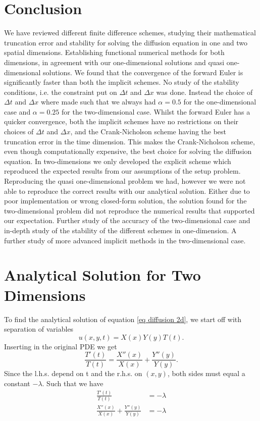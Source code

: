 \documentclass[%
reprint,
nofootinbib,
amsmath,amssymb,
aps,
]{revtex4-1}
\newcommand{\dt}{{\Delta t}}
\newcommand{\dx}{{\Delta x}}
\begin{document}
\section{Conclusion} %
We have reviewed different finite difference schemes, studying their mathematical truncation error and stability for solving the diffusion equation in one and two spatial dimensions. Establishing functional numerical methods for both dimensions, in agreement with our one-dimensional solutions and quasi one-dimensional solutions. We found that the convergence of the forward Euler is significantly faster than both the implicit schemes. No study of the stability conditions, i.e. the constraint put on $\dt$ and $\dx$ was done. Instead the choice of $\dt$ and $\dx$ where made such that we always had $\alpha = 0.5$ for the one-dimensional case and $\alpha = 0.25$ for the two-dimensional case. Whilst the forward Euler has a quicker convergence, both the implicit schemes have no restrictions on their choices of $\dt$ and $\dx$, and the Crank-Nicholson scheme having the best truncation error in the time dimension. This makes the Crank-Nicholson scheme, even though computationally expensive, the best choice for solving the diffusion equation. In two-dimensions we only developed the explicit scheme which reproduced the expected results from our assumptions of the setup problem. Reproducing the quasi one-dimensional problem we had, however we were not able to reproduce the correct results with our analytical solution. Either due to poor implementation or wrong closed-form solution, the solution found for the two-dimensional problem did not reproduce the numerical results that supported our expectation. Further study of the accuracy of the two-dimensional case and in-depth study of the stability of the different schemes in one-dimension. A further study of more advanced implicit methods in the two-dimensional case.





\appendix
\section{Analytical Solution for Two Dimensions}\label{app 2DA}
To find the analytical solution of equation \eqref{eq diffusion 2d}, we start off with separation of variables
\begin{equation}
	u(x,y,t) = X(x)Y(y)T(t).
\end{equation}
Inserting in the original PDE we get 
\begin{equation}
	\frac{T'(t)}{T(t)} = \frac{X''(x)}{X(x)} + \frac{Y''(y)}{Y(y)}.
\end{equation}
Since the l.h.s. depend on t and the r.h.s. on $(x,y)$, both sides must equal a constant $-\lambda$. Such that we have 
\begin{equation}\label{eq 2d speration}
	\begin{split}
		\frac{T'(t)}{T(t)} &= -\lambda \\
		\frac{X''(x)}{X(x)} + \frac{Y''(y)}{Y(y)}&= -\lambda 
	\end{split}
\end{equation}
\end{document}
